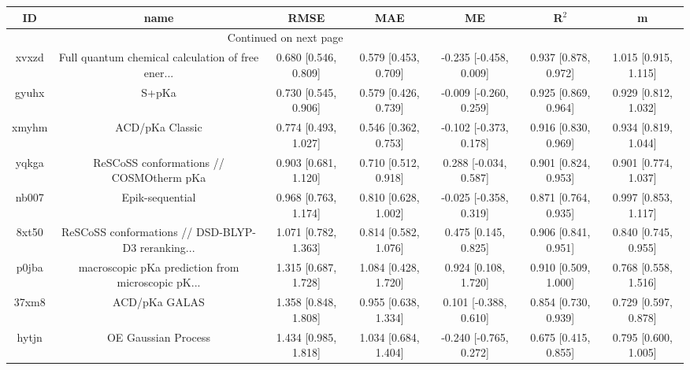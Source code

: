 \documentclass{article}
\begin{document}
\begin{center}
\begin{longtable}{|ccccccc|}
\toprule
    ID &                                               name &                  RMSE &                   MAE &                       ME &                 R$^2$ &                      m \\
\midrule
\endhead
\midrule
\multicolumn{3}{r}{{Continued on next page}} \\
\midrule
\endfoot

\bottomrule
\endlastfoot
 xvxzd &  Full quantum chemical calculation of free ener... &  0.680 [0.546, 0.809] &  0.579 [0.453, 0.709] &   -0.235 [-0.458, 0.009] &  0.937 [0.878, 0.972] &   1.015 [0.915, 1.115] \\
 gyuhx &                                              S+pKa &  0.730 [0.545, 0.906] &  0.579 [0.426, 0.739] &   -0.009 [-0.260, 0.259] &  0.925 [0.869, 0.964] &   0.929 [0.812, 1.032] \\
 xmyhm &                                    ACD/pKa Classic &  0.774 [0.493, 1.027] &  0.546 [0.362, 0.753] &   -0.102 [-0.373, 0.178] &  0.916 [0.830, 0.969] &   0.934 [0.819, 1.044] \\
 yqkga &            ReSCoSS conformations // COSMOtherm pKa &  0.903 [0.681, 1.120] &  0.710 [0.512, 0.918] &    0.288 [-0.034, 0.587] &  0.901 [0.824, 0.953] &   0.901 [0.774, 1.037] \\
 nb007 &                                    Epik-sequential &  0.968 [0.763, 1.174] &  0.810 [0.628, 1.002] &   -0.025 [-0.358, 0.319] &  0.871 [0.764, 0.935] &   0.997 [0.853, 1.117] \\
 8xt50 &  ReSCoSS conformations // DSD-BLYP-D3 reranking... &  1.071 [0.782, 1.363] &  0.814 [0.582, 1.076] &     0.475 [0.145, 0.825] &  0.906 [0.841, 0.951] &   0.840 [0.745, 0.955] \\
 p0jba &  macroscopic pKa prediction from microscopic pK... &  1.315 [0.687, 1.728] &  1.084 [0.428, 1.720] &     0.924 [0.108, 1.720] &  0.910 [0.509, 1.000] &   0.768 [0.558, 1.516] \\
 37xm8 &                                      ACD/pKa GALAS &  1.358 [0.848, 1.808] &  0.955 [0.638, 1.334] &    0.101 [-0.388, 0.610] &  0.854 [0.730, 0.939] &   0.729 [0.597, 0.878] \\
 hytjn &                                OE Gaussian Process &  1.434 [0.985, 1.818] &  1.034 [0.684, 1.404] &   -0.240 [-0.765, 0.272] &  0.675 [0.415, 0.855] &   0.795 [0.600, 1.005] \\

\end{longtable}
\end{center}
\end{document}
